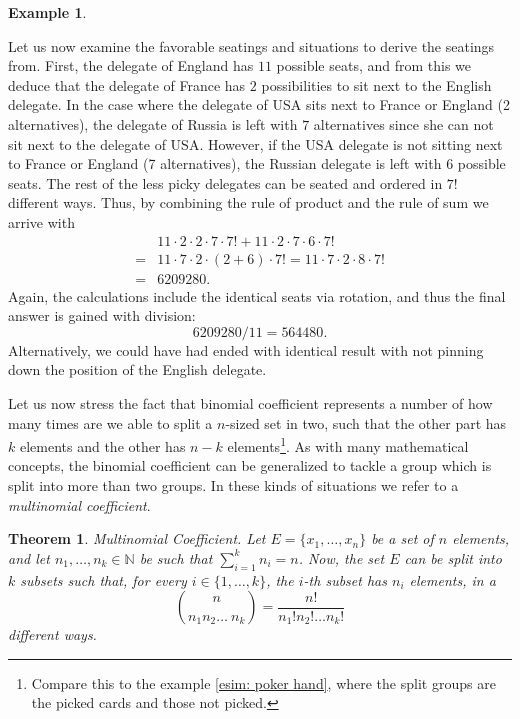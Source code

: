 \documentclass[12pt,a4paper,leqno]{report}
\newcommand{\N}{\mathbb{N}}
\theoremstyle{plain}
\newtheorem{lause}[equation]{Theorem}
\theoremstyle{definition}
\newtheorem{esim}[equation]{Example}
\begin{document}
\begin{esim}
\begin{enumerate}[a)]
Let us now examine the favorable seatings and situations to derive the seatings from. First, the delegate of England has $11$ possible seats, and from this we deduce that the delegate of France has $2$ possibilities to sit next to the English delegate. In the case where the delegate of USA sits next to France or England (2 alternatives), the delegate of Russia is left with $7$ alternatives since she can not sit next to the delegate of USA. However, if the USA delegate is not sitting next to France or England (7 alternatives), the Russian delegate is left with $6$ possible seats. The rest of the less picky delegates can be seated and ordered in $7!$ different ways. Thus, by combining the rule of product and the rule of sum we arrive with
\[
\begin{split}
&11 \cdot 2 \cdot 2 \cdot 7 \cdot 7! + 11 \cdot 2 \cdot 7 \cdot 6 \cdot 7! \\
=& 11 \cdot 7 \cdot 2 \cdot (2+6) \cdot 7! = 11 \cdot 7 \cdot 2 \cdot 8 \cdot 7! \\ =& 6209280.
\end{split}
\]
Again, the calculations include the identical seats via rotation, and thus the final answer is gained with division:
\[
6209280/11 = 564480.
\]
Alternatively, we could have had ended with identical result with not pinning down the position of the English delegate.
\end{enumerate}
\end{esim}

\bigskip

Let us now stress the fact that binomial coefficient represents a number of how many times are we able to split a $n$-sized set in two, such that the other part has $k$ elements and the other has $n-k$ elements\footnote{Compare this to the example \ref{esim: poker hand}, where the split groups are the picked cards and those not picked.}. As with many mathematical concepts, the binomial coefficient can be generalized to tackle a group which is split into more than two groups. In these kinds of situations we refer to a \emph{multinomial coefficient}.

\begin{lause}\label{lause:multinomial coefficient} Multinomial Coefficient.
Let $E = \{x_1, \dots , x_n\}$ be a set of $n$ elements, and let $n_1, \dots, n_k \in \N$ be such that $\sum_{i=1}^k n_i = n$. Now, the set $E$ can be split into $k$ subsets such that, for every $i \in \{1, \dots , k\}$, the  $i$-th subset has $n_i$ elements, in a 
\[
\binom{n}{n_1 n_2 \dots \ n_k} = \frac{n!}{n_1!n_2! \dots n_k!}
\]
different ways.
\end{lause}
\end{document}
